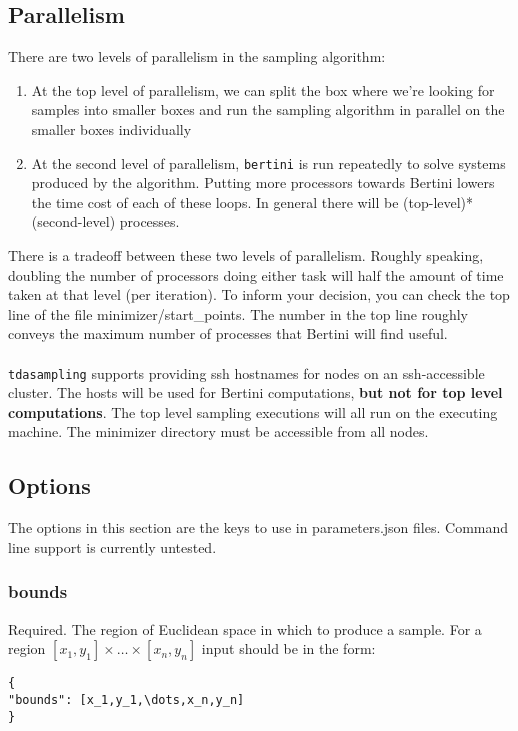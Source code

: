 \documentclass[11pt]{article}
\begin{document}
\subsection{Parallelism}
There are two levels of parallelism in the sampling algorithm: 
\begin{enumerate}
\item At the top level of parallelism, we can split the box where we're looking for samples into smaller boxes and run the sampling algorithm in parallel on the smaller boxes individually
\item At the second level of parallelism, \texttt{bertini} is run repeatedly to solve systems produced by the algorithm. Putting more processors towards Bertini lowers the time cost of each of these loops. In general there will be (top-level)*(second-level) processes. 
\end{enumerate} 

There is a tradeoff between these two levels of parallelism. Roughly speaking, doubling 
the number of processors doing either task will half the amount of time taken at that 
level (per iteration). To inform your decision, you can check the top line of the file 
minimizer/start\_points. The number in the top line roughly conveys the maximum number of 
processes that Bertini will find useful. \\ \\ 

\texttt{tdasampling} supports providing ssh hostnames for nodes on an ssh-accessible cluster. The hosts will be used for Bertini computations, {\bf but not for top level computations}. The top level sampling executions will all run on the executing machine. The minimizer directory must be accessible from all nodes. 

\subsection{Options} 
The options in this section are the keys to use in parameters.json files. Command line support is currently untested. 

\subsubsection{bounds}
Required. The region of Euclidean space in which to produce a sample. For a region $[x_1,y_1] \times\dots\times [x_n,y_n]$ input should be in the form: 
\begin{verbatim}
{
"bounds": [x_1,y_1,\dots,x_n,y_n]
}
\end{verbatim} 
\end{document}
